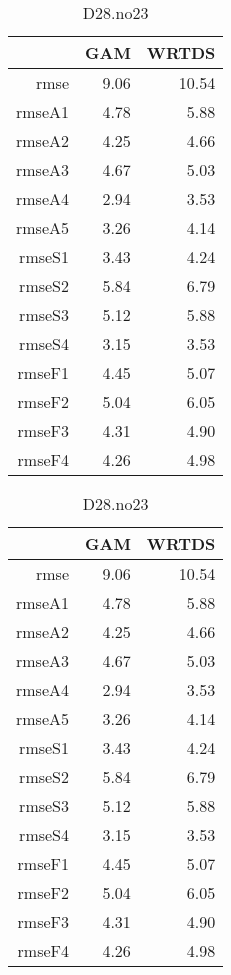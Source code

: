 \documentclass[12pt]{amsart}
\begin{document}

\begin{table}[H]
\centering
\begin{tabular}{rrr}
  \hline
 & GAM & WRTDS \\ 
  \hline
rmse & 9.06 & 10.54 \\ 
  rmseA1 & 4.78 & 5.88 \\ 
  rmseA2 & 4.25 & 4.66 \\ 
  rmseA3 & 4.67 & 5.03 \\ 
  rmseA4 & 2.94 & 3.53 \\ 
  rmseA5 & 3.26 & 4.14 \\ 
  rmseS1 & 3.43 & 4.24 \\ 
  rmseS2 & 5.84 & 6.79 \\ 
  rmseS3 & 5.12 & 5.88 \\ 
  rmseS4 & 3.15 & 3.53 \\ 
  rmseF1 & 4.45 & 5.07 \\ 
  rmseF2 & 5.04 & 6.05 \\ 
  rmseF3 & 4.31 & 4.90 \\ 
  rmseF4 & 4.26 & 4.98 \\ 
   \hline
\end{tabular}
\caption{D28.no23}
\end{table}

\begin{table}[H]
\centering
\begin{tabular}{rrr}
  \hline
 & GAM & WRTDS \\ 
  \hline
rmse & 9.06 & 10.54 \\ 
  rmseA1 & 4.78 & 5.88 \\ 
  rmseA2 & 4.25 & 4.66 \\ 
  rmseA3 & 4.67 & 5.03 \\ 
  rmseA4 & 2.94 & 3.53 \\ 
  rmseA5 & 3.26 & 4.14 \\ 
  rmseS1 & 3.43 & 4.24 \\ 
  rmseS2 & 5.84 & 6.79 \\ 
  rmseS3 & 5.12 & 5.88 \\ 
  rmseS4 & 3.15 & 3.53 \\ 
  rmseF1 & 4.45 & 5.07 \\ 
  rmseF2 & 5.04 & 6.05 \\ 
  rmseF3 & 4.31 & 4.90 \\ 
  rmseF4 & 4.26 & 4.98 \\ 
   \hline
\end{tabular}
\caption{D28.no23}
\end{table}
\end{document}
